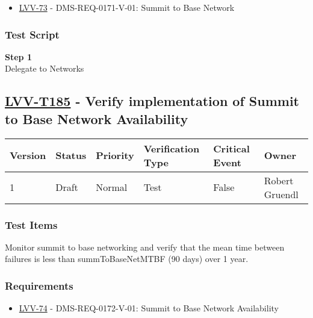 \begin{itemize}
\tightlist
\item
  \href{https://jira.lsstcorp.org/browse/LVV-73}{LVV-73} -
  DMS-REQ-0171-V-01: Summit to Base Network
\end{itemize}

\subsubsection{Test Script}\label{test-script-43}

\textbf{Step 1}\\
Delegate to Networks\\[2\baselineskip]

\hypertarget{lvv-t185---verify-implementation-of-summit-to-base-network-availability}{\subsection{\texorpdfstring{\href{https://jira.lsstcorp.org/secure/Tests.jspa\#/testCase/LVV-T185}{LVV-T185}
- Verify implementation of Summit to Base Network
Availability}{LVV-T185 - Verify implementation of Summit to Base Network Availability}}\label{lvv-t185---verify-implementation-of-summit-to-base-network-availability}}

\begin{longtable}[]{@{}llllll@{}}
\toprule
Version & Status & Priority & Verification Type & Critical Event &
Owner\tabularnewline
\midrule
\endhead
1 & Draft & Normal & Test & False & Robert Gruendl\tabularnewline
\bottomrule
\end{longtable}

\subsubsection{Test Items}\label{test-items-44}

Monitor summit to base networking and verify that the mean time between
failures is less than summToBaseNetMTBF (90 days) over 1 year.

\subsubsection{Requirements}\label{requirements-44}

\begin{itemize}
\tightlist
\item
  \href{https://jira.lsstcorp.org/browse/LVV-74}{LVV-74} -
  DMS-REQ-0172-V-01: Summit to Base Network Availability
\end{itemize}

